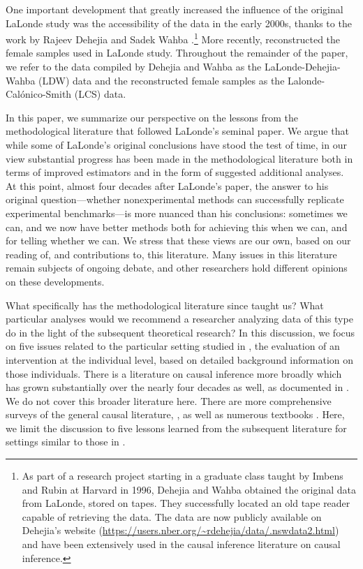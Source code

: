 \documentclass[letterpaper,12pt,leqno]{article}
\begin{document}
One important development that greatly increased the influence of the original LaLonde study was the accessibility of the data in the early 2000s, thanks to the work by Rajeev Dehejia and Sadek Wahba
\citep{dehejiawahba, dehejia2002propensity}.\footnote{As part of a research project starting in a graduate class taught by Imbens and Rubin at Harvard in 1996, Dehejia and Wahba obtained the original data from LaLonde, stored on tapes. They successfully located an old tape reader capable of retrieving the data. The data are now publicly available on Dehejia's website (\url{https://users.nber.org/~rdehejia/data/.nswdata2.html}) and have been extensively used in the causal inference literature on causal inference.} More recently, \citet{calonico2017women} reconstructed the female samples used in LaLonde study. Throughout the remainder of the paper, we refer to the data compiled by Dehejia and Wahba as the LaLonde-Dehejia-Wahba (LDW) data and the reconstructed female samples as the Lalonde-Cal{\'o}nico-Smith (LCS) data.


In this paper, we summarize our perspective on the lessons from the methodological literature that followed LaLonde's seminal paper. We argue that while some of LaLonde's original conclusions have stood the test of time, in our view substantial progress has been made in the methodological literature both in terms of improved estimators and in the form of suggested additional analyses. At this point, almost four decades after LaLonde's paper, the answer to his original question---whether nonexperimental methods can successfully replicate experimental benchmarks---is more nuanced than his conclusions: sometimes we can, and we now have better methods both for achieving this when we can, and for telling whether we can. We stress that these views are our own, based on our reading of, and contributions to, this literature. Many issues in this literature remain subjects of ongoing debate, and  other researchers hold different opinions on these developments.


What specifically has the methodological literature since \citet{LaLonde} taught us? What particular analyses would we recommend a researcher analyzing data of this type do in the light of the subsequent theoretical research? In this discussion, we focus on five issues related to the particular setting studied in \citet{LaLonde}, the evaluation of an intervention at the individual level, based on detailed background information on those individuals. There is a literature on causal inference more broadly which has grown substantially over the nearly four decades as well, as documented in \citet{currie2020technology}. We do not cover this broader literature here. There are more comprehensive surveys of the general causal literature,  \citep[e.g.,][]{abadie2018econometric, imbens2009recent}, as well as numerous textbooks \citep{angrist2008mostly, imbens2015causal, cunningham2018causal, huntington2021effect, huber2023causal}. Here, we limit the discussion to five lessons learned from the subsequent literature for settings similar to those in \cite{LaLonde}.
\end{document}
